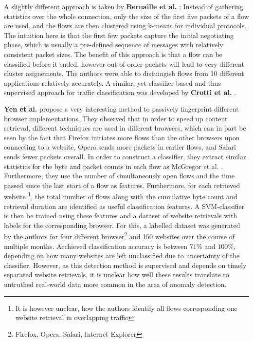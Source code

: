 \documentclass[a4paper,12pt,twoside]{report}
\begin{document}
A slightly different approach is taken by \textbf{Bernaille et al.} \cite{bernaille2006traffic}: Instead of gathering statistics over the whole connection, only the size of the first five packets of a flow are used, and the flows are then clustered using k-means for individual protocols. The intuition here is that the first few packets capture the initial negotiating phase, which is usually a pre-defined sequence of messages with relatively consistent packet sizes. The benefit of this approach is that a flow can be classified before it ended, however out-of-order packets will lead to very different cluster asignements. The authors were able to distuingish flows from 10 different applications relatively accurately. A similar, yet classifier-based and thus supervised approach for traffic classification was developed by \textbf{Crotti et al.} \cite{crotti2007traffic}.

\textbf{Yen et al.} \cite{yen2009browser} propose a very interesting method to passively fingerprint different browser implementations. They observed that in order to speed up content retrieval, different techniques are used in different browsers, which can in part be seen by the fact that Firefox initiates more flows than the other browsers upon connecting to a website, Opera sends more packets in earlier flows, and Safari sends fewer packets overall. In order to construct a classifier, they extract similar statistics for the byte and packet counts in each flow as McGregor et al. \cite{mcgregor2004flow}. Furthermore, they use the number of simultaneously open flows and the time passed since the last start of a flow as features. Furthermore, for each retrieved website \footnote{It is however unclear, how the authors identify all flows corresponding one website retrieval in overlapping traffic}, the total number of flows along with the cumulative byte count and retrieval duration are identified as useful classification features. A SVM-classifier is then be trained using these features and a dataset of website retrievals with labels for the corresponding browser. For this, a labelled dataset was generated by the authors for four different browser\footnote{Firefox, Opera, Safari, Internet Explorer} and 150 websites over the course of multiple months. Acchieved classification accuracy is between $71\%$ and $100\%$, depending on how many websites are left unclassified due to uncertainty of the classifier. However, as this detection method is supervised and depends on timely separated website retrievals, it is unclear how well these results translate to untruthed real-world data more common in the area of anomaly detection.
\end{document}

